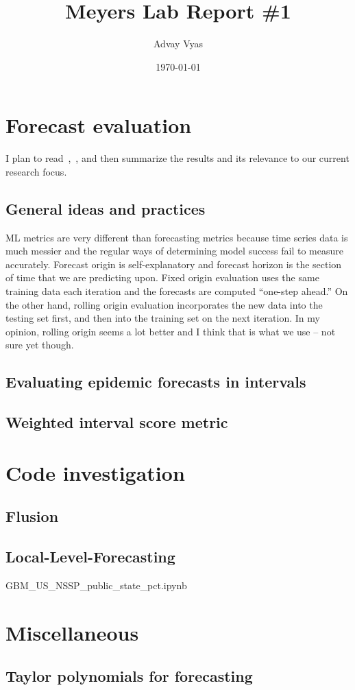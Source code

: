 \documentclass[12pt]{article}
\title{Meyers Lab Report \#1}
\author{Advay Vyas}
\date{\today}
\begin{document}
\maketitle

\tableofcontents
\section{Forecast evaluation}
I plan to read~\cite{hewamalage23},~\cite{bracher21}, and then summarize the results and its relevance to our current research focus.
\subsection{General ideas and practices}
ML metrics are very different than forecasting metrics because time series data is much messier and the regular ways of determining model success fail to measure accurately. Forecast origin is self-explanatory and forecast horizon is the section of time that we are predicting upon. Fixed origin evaluation uses the same training data each iteration and the forecasts are computed ``one-step ahead.'' On the other hand, rolling origin evaluation incorporates the new data into the testing set first, and then into the training set on the next iteration. In my opinion, rolling origin seems a lot better and I think that is what we use -- not sure yet though. 
\subsection{Evaluating epidemic forecasts in intervals}
\subsection{Weighted interval score metric}

\section{Code investigation}
\subsection{Flusion}
\subsection{Local-Level-Forecasting}
GBM\_US\_NSSP\_public\_state\_pct.ipynb

\section{Miscellaneous}
\subsection{Taylor polynomials for forecasting}


\printbibliography
\end{document}
